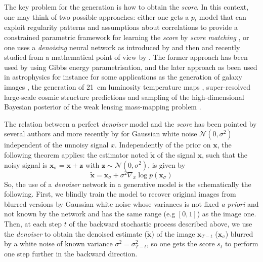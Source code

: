 \documentclass[11pt]{amsart}
\begin{document}
The key problem for the generation is how to obtain the \textit{score}. In this context, one may think of two possible approaches: either one gets a $p_t$ model that can exploit regularity patterns and assumptions about correlations to provide a constrained parametric framework for learning the \textit{score} by \textit{score matching} \citep{hyvarinen2005a}, or one uses a \textit{denoising} neural network as introduced by \cite{Bengio2013} and then \cite{Sohl-Dickstein2015,Ho2020} and recently studied from a mathematical point of view by \citep{kadkhodaie2024generalization}. The former approach has been used by \cite[e.g.][]{Guth2022b,Lempereur2024} using Gibbs energy parametrisation, and the later approach as been used in astrophysics for instance for some applications as the generation of galaxy images \citep{smith2021}, the generation of 21~cm luminosity temperature maps \citep{Zhao2023}, super-resolved large-scale cosmic structure predictions \citep{Schanz2023} and sampling of the high-dimensional Bayesian posterior of the weak lensing mass-mapping problem \citep{Remy2023}.

The relation between a perfect \textit{denoiser} model and the \textit{score} has been pointed by several authors \cite[e.g.][]{tweedie1947functions,herbert1956empirical,miyasawa1961empirical} and more recently by \cite{Raphan2011} for Gaussian white noise $\mathcal{N}(0,\sigma^2)$ independent of the unnoisy signal $x$. Independently of the prior on $\bm{x}$, the following theorem applies: the estimator noted $\tilde{\bm{x}}$ of the signal $\bm{x}$, such that the noisy signal is $\bm{x}_\sigma=\bm{x}+\bm{z}$ with $\bm{z}\sim\mathcal{N}(0,\sigma^2)$, is given by
\begin{equation}
\tilde{\bm{x}}= \bm{x}_\sigma + \sigma^2 \nabla_x \log p(\bm{x}_\sigma)
\label{thm-score-denoising}
\end{equation}
%
So, the use of a \textit{denoiser} network in a generative model is the schematically the following. First, we blindly train the model to recover original images from blurred versions by Gaussian white noise whose variances is not fixed \textit{a priori} and not known by the network and has the same range (e.g $[0,1]$) as the image one. Then, at each step $t$ of the backward stochastic process described above, we use the \textit{denoiser} to obtain the denoised estimate ($\tilde{\bm{x}}$) of the image $\bm{x}_{T-t}$ ($\bm{x}_\sigma$) blurred by a white noise of known variance $\sigma^2=\sigma^2_{T-t}$, so one gets the score $s_t$ to perform one step further in the backward direction.
\end{document}
